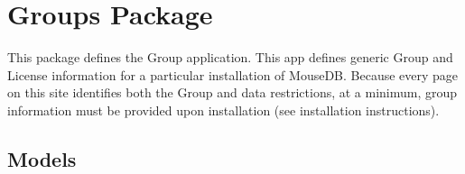 \documentclass[letterpaper,10pt,english]{sphinxmanual}
\begin{document}
\section{Groups Package}
\label{api:module-groups}\label{api:groups-package}
This package defines the Group application.
This app defines generic Group and License information for a particular installation of MouseDB.  
Because every page on this site identifies both the Group and data restrictions, at a minimum, group information must be provided upon installation (see installation instructions).


\subsection{Models}
\label{api:id11}\label{api:module-groups.models}
\end{document}
